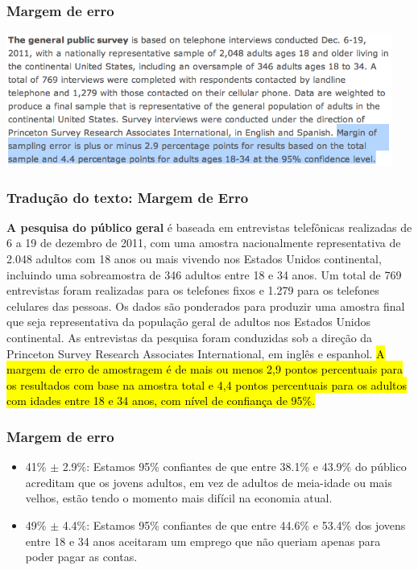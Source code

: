 \begin{frame}
\frametitle{Margem de erro}

\begin{center}
\includegraphics[width=0.95\textwidth]{4-1_var_in_est/pew4.png}
\end{center}

\end{frame}

\begin{frame}
\frametitle{Tradução do texto: Margem de Erro}
\justifying
\small{
\textbf{A pesquisa do público geral} é baseada em entrevistas telefônicas realizadas de 6 a 19 de dezembro de 2011, com uma amostra nacionalmente representativa de 2.048 adultos com 18 anos ou mais vivendo nos Estados Unidos continental, incluindo uma sobreamostra de 346 adultos entre 18 e 34 anos. Um total de 769 entrevistas foram realizadas para os telefones fixos e 1.279 para os telefones celulares das pessoas. Os dados são ponderados para produzir uma amostra final que seja representativa da população geral de adultos nos Estados Unidos continental. As entrevistas da pesquisa foram conduzidas sob a direção da Princeton Survey Research Associates International, em inglês e espanhol. \hl{A margem de erro de amostragem é de mais ou menos 2,9 pontos percentuais para os resultados com base na amostra total e 4,4 pontos percentuais para os adultos com idades entre 18 e 34 anos, com nível de confiança de 95\%.}
}

\end{frame}

\begin{frame}
\frametitle{Margem de erro}

\begin{itemize}
\justifying
\item 41\% $\pm$ 2.9\%: Estamos 95\% confiantes de que entre 38.1\% e 43.9\% do público acreditam que os jovens adultos, em vez de adultos de meia-idade ou mais velhos, estão tendo o momento mais difícil na economia atual.

\justifying
\item 49\% $\pm$ 4.4\%: Estamos 95\% confiantes de que entre 44.6\% e 53.4\% dos jovens entre 18 e 34 anos aceitaram um emprego que não queriam apenas para poder pagar as contas.

\end{itemize}

\end{frame}

